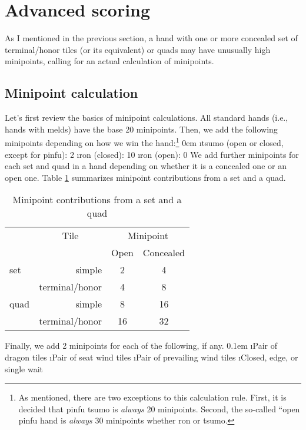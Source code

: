 \newpage

\section{Advanced scoring} \label{sec:scores2}

As I mentioned in the previous section, a hand with one or more concealed set of terminal/honor tiles (or its equivalent) or quads may have unusually high minipoints, calling for an actual calculation of minipoints. 

\subsection{Minipoint calculation}
	 
Let's first review the basics of minipoint calculations. 
All standard hands (i.e., hands with melds) have the base 20 minipoints. Then, we add the following minipoints depending on how we win the hand:\footnote{As mentioned, there are two exceptions to this calculation rule. First, it is decided that {\jap pinfu} {\jap tsumo} is \emph{always} 20 minipoints. Second, the so-called ``open {\jap pinfu} hand is \emph{always} 30 minipoints whether {\jap ron} or {\jap tsumo}.}
\bi \itemsep0em
\i {\jap tsumo} (open or closed, except for {\jap pinfu}): 2
\i {\jap ron} (closed): 10
\i {\jap ron} (open): 0
\ei 
We add further minipoints for each set and quad in a hand depending on whether it is a concealed one or an open one. Table \ref{tbl:minip_set} summarizes minipoint contributions from a set and a quad. 
{\begin{table}[h!]\centering\small\captionsetup{font=small}
\caption{Minipoint contributions from a set and a quad} \label{tbl:minip_set}
\begin{tabular}{l r c c}
\toprule
& \multicolumn{1}{c}{Tile} & \multicolumn{2}{c}{Minipoint}\\
&  & {\footnotesize Open} & {\footnotesize Concealed}\\
\midrule
set	& simple & 2 & 4\\
	& terminal/honor & 4 & 8\\
\midrule
quad	 & simple & 8 & 16\\
	& terminal/honor & 16 & 32\\
\bottomrule
\end{tabular}
\end{table}}

\newpage
\noindent Finally, we add 2 minipoints for each of the following, if any. 
\bi \itemsep0.1em
\i Pair of dragon tiles
\i Pair of seat wind tiles
\i Pair of prevailing wind tiles
\i Closed, edge, or single wait
\ei

